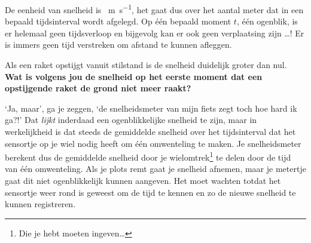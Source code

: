 \documentclass{ximera}
\begin{document}
De eenheid van snelheid is \SI{}{\meter\per\second}, het gaat dus over het aantal meter dat in een bepaald tijds\-in\-ter\-val wordt afgelegd. 
Op één bepaald moment \(t\), één ogenblik, is er helemaal geen tijdsverloop en bijgevolg kan er ook geen verplaatsing zijn \ldots! Er is immers geen tijd verstreken om afstand te kunnen afleggen.

\begin{denkvraag*}{}
Als een raket opstijgt vanuit stilstand is de snelheid duidelijk groter dan nul. \textbf{Wat is volgens jou de snelheid op het eerste moment dat een opstijgende raket de grond niet meer raakt?}
\end{denkvraag*}


`Ja, maar', ga je zeggen, `de snelheidsmeter van mijn fiets zegt toch hoe hard ik ga?!' 
Dat \textit{lijkt} inderdaad een ogenblikkelijke snelheid te zijn, maar in werkelijkheid is dat steeds de gemiddelde snelheid over het tijdsinterval dat het sensortje op je wiel nodig heeft om één omwenteling te maken. 
Je snelheidsmeter berekent dus de gemiddelde snelheid door je wielomtrek\footnote{Die je hebt moeten ingeven\ldots} te delen door de tijd van één omwenteling. 
Als je plots remt gaat je snelheid afnemen, maar je metertje gaat dit niet ogenblikkelijk kunnen aangeven. 
Het moet wachten totdat het sensortje weer rond is geweest om de tijd te kennen en zo de nieuwe snelheid te kunnen registreren.
\end{document}
